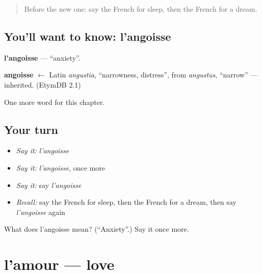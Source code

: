 \label{lesson:FR-C155-angoisse}



\begin{quote}
Before the new one: say the French for sleep, then the French for a dream.
\end{quote}

\subsection*{You'll want to know: l'angoisse}
\textbf{l'angoisse} — \textquotedblleft{}anxiety\textquotedblright{}.

\begin{cousinweb}
\textbf{angoisse} $\leftarrow$ Latin \emph{angustia}, \textquotedblleft{}narrowness, distress\textquotedblright{}, from \emph{angustus}, \textquotedblleft{}narrow\textquotedblright{} — inherited. (EtymDB 2.1)
\end{cousinweb}

\begin{grammarlens}[title={What you've built}]
One more word for this chapter.
\end{grammarlens}

\subsection*{Your turn}
\begin{itemize}
\raggedright
  \item \emph{Say it:} \emph{l'angoisse}
  \item \emph{Say it:} \emph{l'angoisse}, once more
  \item \emph{Say it:} say \emph{l'angoisse}
  \item \emph{Recall:} say the French for sleep, then the French for a dream, then say \emph{l'angoisse} again
\end{itemize}

\begin{tcolorbox}[breakable,colback=teal!4,colframe=teal!35!black,title={Before you move on}]
What does l'angoisse mean? (\textquotedblleft{}Anxiety\textquotedblright{}.) Say it once more.
\end{tcolorbox}
\section[l'amour]{l'amour — love}

\label{lesson:FR-C155-amour}



